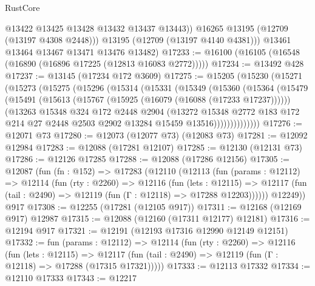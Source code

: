 \begin{lexlean}{RustCore}
\begin{coremodule}
              @13422
              @13425
              @13428
              @13432
              @13437
              @13443))
          @16265
          @13195
          (@12709 (@13197 @4308 @2448)))
        @13195
        (@12709 (@13197 @4140 @4381)))
      @13461
      @13464
      @13467
      @13471
      @13476
      @13482)
@17233 := @16100 (@16105 (@16548 (@16890 (@16896 @17225 (@12813 @16083 @2772)))))
@17234 := @13492 @428
@17237 := @13145 (@17234 @172 @3609)
@17275 := @15205
    (@15230
      (@15271
        (@15273
          (@15275
            (@15296
              (@15314
                (@15331
                  (@15349
                    (@15360
                      (@15364
                        (@15479
                          (@15491
                            (@15613 (@15767 (@15925 (@16079 (@16088 (@17233 @17237))))))
                            (@13263
                              @15348
                              @324
                              @172
                              @2448
                              @2904
                              (@13272
                                @15348
                                @2772
                                @183
                                @172
                                @214
                                @27
                                @2448
                                @2503
                                @2902
                                @13284
                                @15459
                                @13516))))))))))))))
@17276 := @12071 @73
@17280 := @12073 (@12077 @73) (@12083 @73)
@17281 := @12092 @12984
@17283 := @12088 (@17281 @12107)
@17285 := @12130 (@12131 @73)
@17286 := @12126 @17285
@17288 := @12088 (@17286 @12156)
@17305 := @12087
    (fun (fn : @152) =>
    @17283
      (@12110
        (@12113
          (fun (params : @12112) =>
          @12114
            (fun (rty : @2260) =>
            @12116
              (fun (lets : @12115) =>
              @12117 (fun (tail : @2490) => @12119 (fun (Γ : @12118) => @17288 @12203))))))
        @12249))
    @917
@17308 := @12255 (@17281 (@12105 @917))
@17311 := @12168 (@12169 @917) @12987
@17315 := @12088 (@12160 (@17311 @12177) @12181)
@17316 := @12194 @917
@17321 := @12191 (@12193 @17316 @12990 @12149 @12151)
@17332 := fun (params : @12112) =>
  @12114
    (fun (rty : @2260) =>
    @12116
      (fun (lets : @12115) =>
      @12117 (fun (tail : @2490) => @12119 (fun (Γ : @12118) => @17288 (@17315 @17321)))))
@17333 := @12113 @17332
@17334 := @12110 @17333
@17343 := @12217

\end{coremodule}
\end{lexlean}
